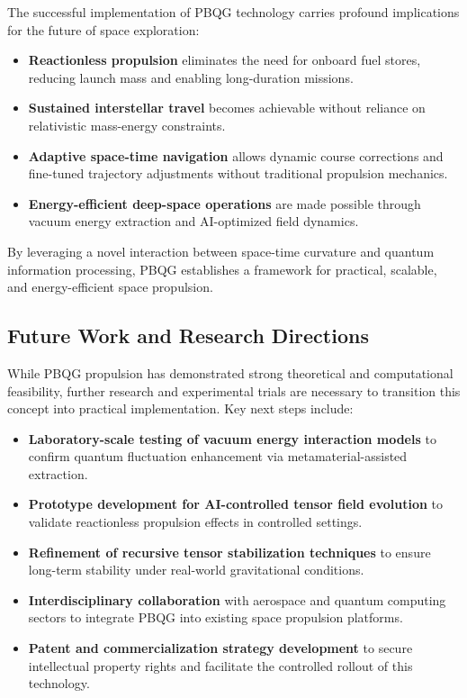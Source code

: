 \documentclass{article}
\theoremstyle{plain}
\begin{document}
The successful implementation of PBQG technology carries profound implications for the future of space exploration:
\begin{itemize}
    \item \textbf{Reactionless propulsion} eliminates the need for onboard fuel stores, reducing launch mass and enabling long-duration missions.
    \item \textbf{Sustained interstellar travel} becomes achievable without reliance on relativistic mass-energy constraints.
    \item \textbf{Adaptive space-time navigation} allows dynamic course corrections and fine-tuned trajectory adjustments without traditional propulsion mechanics.
    \item \textbf{Energy-efficient deep-space operations} are made possible through vacuum energy extraction and AI-optimized field dynamics.
\end{itemize}

By leveraging a novel interaction between space-time curvature and quantum information processing, PBQG establishes a framework for practical, scalable, and energy-efficient space propulsion.

\subsection{Future Work and Research Directions}
\label{subsec:future_work}

While PBQG propulsion has demonstrated strong theoretical and computational feasibility, further research and experimental trials are necessary to transition this concept into practical implementation. Key next steps include:
\begin{itemize}
    \item \textbf{Laboratory-scale testing of vacuum energy interaction models} to confirm quantum fluctuation enhancement via metamaterial-assisted extraction.
    \item \textbf{Prototype development for AI-controlled tensor field evolution} to validate reactionless propulsion effects in controlled settings.
    \item \textbf{Refinement of recursive tensor stabilization techniques} to ensure long-term stability under real-world gravitational conditions.
    \item \textbf{Interdisciplinary collaboration} with aerospace and quantum computing sectors to integrate PBQG into existing space propulsion platforms.
    \item \textbf{Patent and commercialization strategy development} to secure intellectual property rights and facilitate the controlled rollout of this technology.
\end{itemize}
\end{document}
